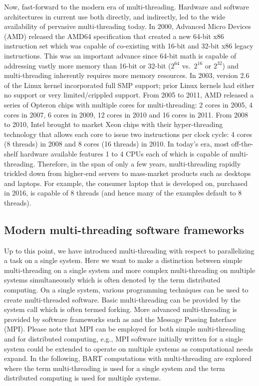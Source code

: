 \documentclass[article]{jss}
\begin{document}
Now, fast-forward to the modern era of multi-threading.  Hardware and
software architectures in current use both directly, and indirectly,
led to the wide availability of pervasive multi-threading today.  In
2000, Advanced Micro Devices (AMD) released the AMD64 specification
that created a new 64-bit x86 instruction set which was capable of
co-existing with 16-bit and 32-bit x86 legacy instructions.  This was
an important advance since 64-bit math is capable of addressing vastly
more memory than 16-bit or 32-bit ($2^{64}$ vs.\ $2^{16}$ or $2^{32}$)
and multi-threading inherently requires more memory resources.  In
2003, version 2.6 of the Linux kernel incorporated full SMP support;
prior Linux kernels had either no support or very limited/crippled
support.  From 2005 to 2011, AMD released a series of Opteron chips
with multiple cores for multi-threading: 2 cores in 2005, 4 cores in
2007, 6 cores in 2009, 12 cores in 2010 and 16 cores in 2011.  From
2008 to 2010, Intel brought to market Xeon chips with their
hyper-threading technology that allows each core to issue two
instructions per clock cycle: 4 cores (8 threads) in 2008 and 8 cores
(16 threads) in 2010.  In today's era, most off-the-shelf hardware
available features 1 to 4 CPUs each of which is capable of
multi-threading.  Therefore, in the span of only a few
years, multi-threading rapidly trickled down from higher-end servers
to mass-market products such as desktops and laptops.  For example, the
consumer laptop that  is developed on, purchased in 2016,
is capable of 8 threads (and hence many of the examples default to 8
threads).

\subsection{Modern multi-threading software frameworks}

Up to this point, we have introduced multi-threading with respect to
parallelizing a task on a single system.  Here we want to make a
distinction between simple multi-threading on a single system and more
complex multi-threading on multiple systems simultaneously which is
often denoted by the term distributed computing.  On a single system,
various programming techniques can be used to create multi-threaded
software.  Basic multi-threading can be provided by the 
system call which is often termed forking.  More advanced
multi-threading is provided by software frameworks such as
 and the Message Passing Interface (MPI).  Please note
that MPI can be employed for both simple multi-threading and for
distributed computing, e.g., MPI software initially written for a
single system could be extended to operate on multiple systems as
computational needs expand.  In the following, BART computations with
multi-threading are explored where the term multi-threading is used
for a single system and the term distributed computing is used for
multiple systems.
\end{document}
